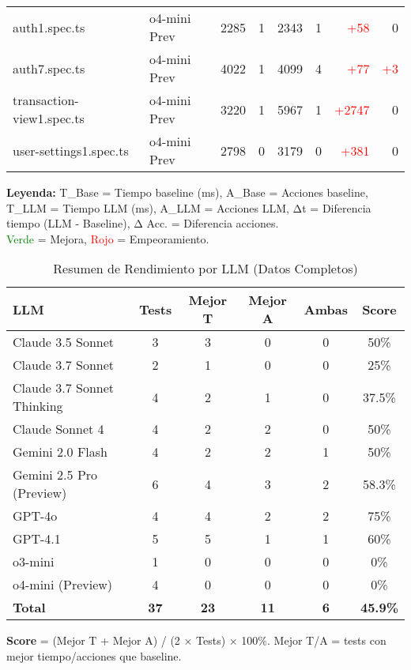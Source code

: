 \begin{table}[htbp]
\begin{tabular}{|p{3cm}|p{2cm}|r|r|r|r|r|r|}
\hline
auth1.spec.ts & o4-mini Prev & 2285 & 1 & 2343 & 1 & \textcolor{red}{+58} & 0 \\
auth7.spec.ts & o4-mini Prev & 4022 & 1 & 4099 & 4 & \textcolor{red}{+77} & \textcolor{red}{+3} \\
transaction-view1.spec.ts & o4-mini Prev & 3220 & 1 & 5967 & 1 & \textcolor{red}{+2747} & 0 \\
user-settings1.spec.ts & o4-mini Prev & 2798 & 0 & 3179 & 0 & \textcolor{red}{+381} & 0 \\
\hline
\end{tabular}
\begin{flushleft}
\tiny
\textbf{Leyenda:} T\_Base = Tiempo baseline (ms), A\_Base = Acciones baseline, T\_LLM = Tiempo LLM (ms), A\_LLM = Acciones LLM, Δt = Diferencia tiempo (LLM - Baseline), Δ Acc. = Diferencia acciones. \\
\textcolor{green}{Verde} = Mejora, \textcolor{red}{Rojo} = Empeoramiento.
\end{flushleft}
\end{table}

\begin{table}[htbp]
\centering
\caption{Resumen de Rendimiento por LLM (Datos Completos)}
\label{tab:performance_summary_complete}
\footnotesize
\begin{tabular}{|l|c|c|c|c|c|}
\hline
\textbf{LLM} & \textbf{Tests} & \textbf{Mejor T} & \textbf{Mejor A} & \textbf{Ambas} & \textbf{Score} \\
\hline
Claude 3.5 Sonnet & 3 & 3 & 0 & 0 & 50\% \\
Claude 3.7 Sonnet & 2 & 1 & 0 & 0 & 25\% \\
Claude 3.7 Sonnet Thinking & 4 & 2 & 1 & 0 & 37.5\% \\
Claude Sonnet 4 & 4 & 2 & 2 & 0 & 50\% \\
Gemini 2.0 Flash & 4 & 2 & 2 & 1 & 50\% \\
Gemini 2.5 Pro (Preview) & 6 & 4 & 3 & 2 & 58.3\% \\
GPT-4o & 4 & 4 & 2 & 2 & 75\% \\
GPT-4.1 & 5 & 5 & 1 & 1 & 60\% \\
o3-mini & 1 & 0 & 0 & 0 & 0\% \\
o4-mini (Preview) & 4 & 0 & 0 & 0 & 0\% \\
\hline
\textbf{Total} & \textbf{37} & \textbf{23} & \textbf{11} & \textbf{6} & \textbf{45.9\%} \\
\hline
\end{tabular}
\begin{flushleft}
\footnotesize
\textbf{Score} = (Mejor T + Mejor A) / (2 × Tests) × 100\%. Mejor T/A = tests con mejor tiempo/acciones que baseline.
\end{flushleft}
\end{table}
